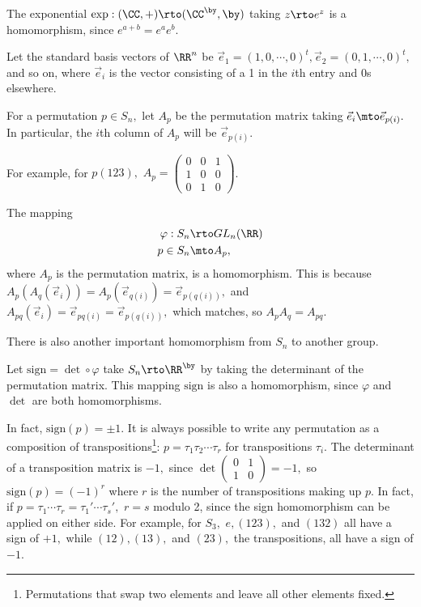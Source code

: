 \begin{example}
The exponential $\text{exp}: (\CC, +) \rto (\CC^{\by}, \by)$ taking $z \rto e^z$ is a homomorphism, since $e^{a+b} = e^a e^b.$
\end{example}
Let the standard basis vectors of $\RR^n$ be $\vec{e}_1 = (1, 0, \cdots, 0)^t, \vec{e}_2 = (0, 1, \cdots, 0)^t,$ and so on, where $\vec{e}_i$ is the vector consisting of a 1 in the $i$th entry and 0s elsewhere.

For a permutation $p \in S_n,$ let $A_p$ be the permutation matrix taking $\vec{e}_i \mto \vec{e}_{p(i)}.$ In particular, the $i$th column of $A_p$ will be $\vec{e}_{p(i)}.$ 

For example, for $p  (123),$ $A_p = \begin{pmatrix} 0 & 0 & 1 \\ 1 & 0 & 0 \\ 0 & 1 & 0 \end{pmatrix}$.

\begin{example}
The mapping
\begin{align*}
\varphi: S_n &\rto GL_n(\RR) \\
p\in S_n &\mto A_p,
\end{align*}
where $A_p$ is the permutation matrix, is a homomorphism. This is because $A_p(A_q(\vec{e}_i)) = A_p(\vec{e}_{q(i)}) = \vec{e}_{p(q(i))},$ and $A_{pq}(\vec{e}_i) = \vec{e}_{pq(i)} = \vec{e}_{p(q(i))},$ which matches, so $A_pA_q = A_{pq}.$
\end{example}

There is also another important homomorphism from $S_n$ to another group.

\begin{example}
Let $\text{sign} = \det \circ \varphi$ take $S_n \rto \RR^{\by}$ by taking the determinant of the permutation matrix. This mapping $\text{sign}$ is also a homomorphism, since $\varphi$ and $\det$ are both homomorphisms. 
\end{example}

In fact, $\text{sign}(p) = \pm 1$. It is always possible to write any permutation as a composition of transpositions\footnote{Permutations that swap two elements and leave all other elements fixed.}: $p = \tau_1\tau_2 \cdots \tau_r$ for transpositions $\tau_i$. The determinant of a transposition matrix is $-1,$ since $\det\begin{pmatrix} 0 & 1 \\ 1 & 0 \end{pmatrix} = -1,$ so $\text{sign}(p) = (-1)^r$ where $r$ is the number of transpositions making up $p.$ In fact, if $p = \tau_1\cdots \tau_r = \tau_1'\cdots\tau_s',$ $r = s$ modulo 2, since the sign homomorphism can be applied on either side. For example, for $S_3,$ $e, (123),$ and $(132)$ all have a sign of $+1,$ while $(12), (13),$ and $(23),$ the transpositions, all have a sign of $-1.$

